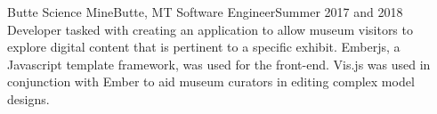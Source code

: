 

\experienceHeading
{Butte Science Mine}{Butte, MT}
{Software Engineer}{Summer 2017 and 2018}
\experienceStart
        {Developer tasked with creating an application to allow museum visitors to explore digital content that is pertinent to a specific exhibit.}
        {Emberjs, a Javascript template framework, was used for the front-end.}
        {Vis.js was used in conjunction with Ember to aid museum curators in editing complex model designs.}
\experienceEnd